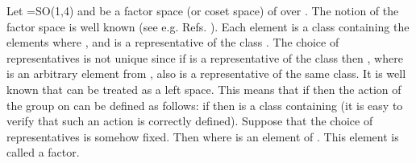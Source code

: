 \documentclass[a4paper,12pt]{article}%
\begin{document}
Let \coordHE{}=SO(1,4) and \coordHE{} be a factor space (or
coset space) of \coordHE{} over \coordHE{}. The notion of the factor 
space is well known (see e.g. Refs. 
\cite{Naimark,Dobrev,Str,Men,Barut}).
Each element \coordHE{} is a class containing the
elements \coordHE{} where \coordHE{}, and \coordHE{} is a
representative of the class \coordHE{}. The choice of
representatives is not unique since if \coordHE{} is
a representative of the class \coordHE{} then
\coordHE{}, where \coordHE{} is an arbitrary element
from \coordHE{}, also is a representative of the same 
class. It is well known that \coordHE{} can be treated 
as a left \coordHE{} space. This means that if \coordHE{}
then the action of the group \coordHE{} on \coordHE{} can be
defined as follows: if \coordHE{} then \coordHE{} is a
class containing \coordHE{} (it is easy to verify
that such an action is correctly defined). 
Suppose that the choice of representatives
is somehow fixed. Then \coordHE{}
where \coordHE{} is an element of \coordHE{}. This
element is called a factor.
\end{document}
